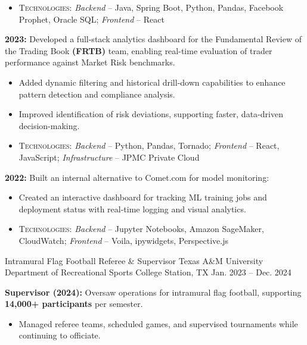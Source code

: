 \begin{cventries}
{\begin{cvitems}
{\begin{itemize}
            \item \textsc{Technologies}: \textit{Backend} – Java, Spring Boot, Python, Pandas, Facebook Prophet, Oracle SQL; \textit{Frontend} – React
          \end{itemize}
            }
            \item { \textbf{2023:} Developed a full-stack analytics dashboard for the Fundamental Review of the Trading Book \textbf{(FRTB)} team, enabling real-time evaluation of trader performance against Market Risk benchmarks.
            \begin{itemize}
            \item Added dynamic filtering and historical drill-down capabilities to enhance pattern detection and compliance analysis.
            \item Improved identification of risk deviations, supporting faster, data-driven decision-making.
            \item \textsc{Technologies}: \textit{Backend} – Python, Pandas, Tornado; \textit{Frontend} – React, JavaScript; \textit{Infrastructure} – JPMC Private Cloud
            \end{itemize}
            }
            \item{ \textbf{2022:} Built an internal alternative to Comet.com for model monitoring:
            \begin{itemize}
            \item Created an interactive dashboard for tracking ML training jobs and deployment status with real-time logging and visual analytics.
            \item \textsc{Technologies}: \textit{Backend} – Jupyter Notebooks, Amazon SageMaker, CloudWatch; \textit{Frontend} – Voila, ipywidgets, Perspective.js
            \end{itemize}
            }
          \end{cvitems}
        }
\cventry
  {Intramural Flag Football Referee \& Supervisor} %
  {Texas A\&M University Department of Recreational Sports} %
  {College Station, TX} %
  {Jan. 2023 -- Dec. 2024} %
  {
    \begin{cvitems}
      \item{
      \textbf{Supervisor (2024):} Oversaw operations for intramural flag football, supporting \textbf{14,000+ participants} per semester.
      \begin{itemize}
      \item Managed referee teams, scheduled games, and supervised tournaments while continuing to officiate.

\end{itemize}}
\end{cvitems}}
\end{cventries}
